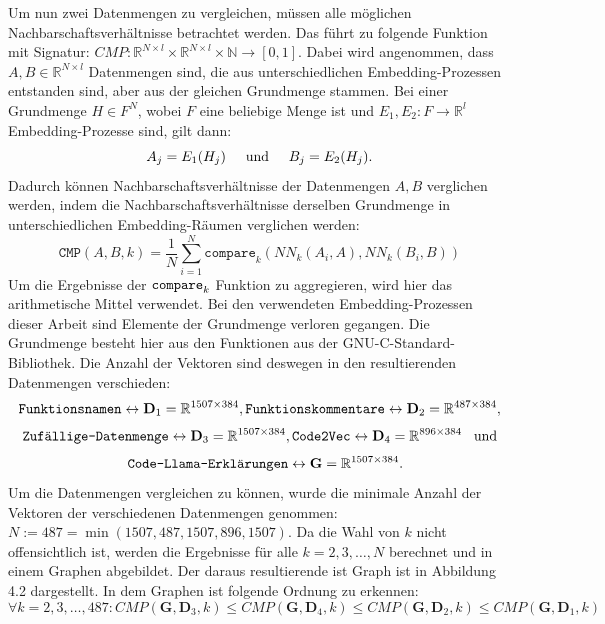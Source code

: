 \documentclass[12pt,letterpaper,ngerman]{article}
\begin{document}
Um nun zwei Datenmengen zu vergleichen, müssen alle möglichen 
Nachbarschaftsverhältnisse betrachtet werden. Das führt zu folgende
Funktion mit Signatur:
$CMP: \mathbb{R}^{N\times l} \times  \mathbb{R}^{N\times l} \times \mathbb{N} \to [0,1]$.
Dabei wird angenommen, dass $A,B \in \mathbb{R}^{N\times l}$ Datenmengen
sind, die aus unterschiedlichen Embedding-Prozessen entstanden sind,
aber aus der gleichen Grundmenge stammen. Bei einer Grundmenge $H \in F^N$,
wobei $F$ eine beliebige Menge ist und   
$E_1,E_2: F \to \mathbb{R}^{l}$ Embedding-Prozesse sind, gilt dann:
\[
  A_j = E_1(H_j)  \hspace{0.5cm }\text{und} 
  \hspace{0.5cm } B_j = E_2(H_j).
\]
Dadurch können Nachbarschaftsverhältnisse der Datenmengen $A,B$ 
verglichen werden, indem die Nachbarschaftsverhältnisse derselben 
Grundmenge in unterschiedlichen Embedding-Räumen verglichen werden:
\[
  \texttt{CMP}(A,B,k) = \frac{1}{N}\sum_{i = 1}^{N}
    \texttt{compare}_k(NN_k(A_i,A),NN_k(B_i, B))
\]
Um die Ergebnisse der $\verb|compare|_k$ Funktion zu aggregieren,
wird hier das arithmetische Mittel verwendet.
Bei den verwendeten Embedding-Prozessen dieser Arbeit sind
Elemente der Grundmenge verloren gegangen. Die Grundmenge besteht 
hier aus den Funktionen aus der GNU-C-Standard-Bibliothek.
Die Anzahl der Vektoren sind deswegen in den resultierenden 
Datenmengen verschieden: 
\[
  \verb|Funktionsnamen| \leftrightarrow \mathbf{D}_1=\mathbb{R}^{1507\times 384},
  \verb|Funktionskommentare| \leftrightarrow \mathbf{D}_2=\mathbb{R}^{487\times 384},
\]
\[
  \verb|Zufällige-Datenmenge|\leftrightarrow \mathbf{D}_3=\mathbb{R}^{1507\times 384},
  \verb|Code2Vec| \leftrightarrow \mathbf{D}_4=\mathbb{R}^{896\times 384} \hspace{0.3cm}\text{und}
\]
\[
  \hspace{0.3cm} \verb|Code-Llama-Erklärungen| \leftrightarrow \mathbf{G}=\mathbb{R}^{1507\times 384}.
\]
Um die Datenmengen vergleichen zu können, wurde die minimale Anzahl
der Vektoren der verschiedenen Datenmengen genommen:
$N:= 487 = \min(1507, 487, 1507, 896, 1507) $. Da die Wahl von $k$ nicht 
offensichtlich ist, werden die Ergebnisse für alle 
$k = 2, 3, \dots, N$ berechnet und in einem 
Graphen abgebildet. Der daraus resultierende ist Graph
ist in Abbildung 4.2 dargestellt. In dem Graphen ist folgende 
Ordnung zu erkennen: 
\[ 
  \forall k=2,3,\dots,487: CMP(\mathbf{G}, \mathbf{D}_3,k) \leq 
    CMP(\mathbf{G}, \mathbf{D}_4, k) \leq 
    CMP(\mathbf{G}, \mathbf{D}_2, k) \leq 
    CMP(\mathbf{G}, \mathbf{D}_1, k)
\]
\end{document}
